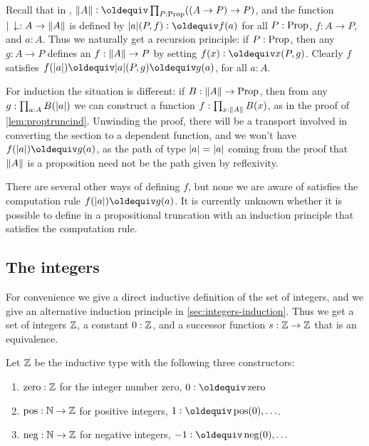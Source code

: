 \documentclass[a4paper,12pt]{amsart}
\begin{document}
Recall that in \UniMath{}, $\Trunc A \defeq \prod_{P:\Prop}((A \to P) \to P)$, and
the function $\trunc{\blank}: A\to\Trunc A$ is
defined by $\trunc a  (P,f) \defeq f(a)$ for all $P: \mathord{\mathrm{Prop}}$, $f: A\to P$, and $a:A$.
Thus we naturally get a recursion principle: if $P: \mathord{\mathrm{Prop}}$, then any
$g: A \to P$ defines an $f : \lVert A\rVert \to P$ by setting $f(x)\defeq x(P,g)$.
Clearly $f$ satisfies $f(\trunc a) \jdeq \trunc a (P,g) \jdeq g(a)$, for all $a:A$.

For induction the situation is different: if $B: \lVert A\rVert \to \mathord{\mathrm{Prop}}$,
then from any $g: \prod_{a:A} B(\lvert a\rvert)$ we can construct a function
$f: \prod_{x:\lVert A\rVert} B(x)$, as in the proof of \cref{lem:proptruncind}.
Unwinding the proof, there will be a transport involved in converting
the section to a dependent function, and we won't have $f(\trunc a) \jdeq g(a)$,
as the path of type $\lvert a\rvert = \lvert a\rvert$ coming from the proof that $\lVert A\rVert$ is
a proposition need not be the path given by reflexivity.

There are several other ways of defining $f$, but none we are aware of
satisfies the computation rule $f(\trunc a)\jdeq g(a)$.  It is currently
unknown whether it is possible to define in \UniMath{} a propositional
truncation with an induction principle that satisfies the computation rule.


\subsection{The integers}
\label{sec:integers}

For convenience we give a direct inductive
definition of the set of integers, and we give
an alternative induction principle in \cref{sec:integers-induction}.
Thus we get a set of integers $\mathbb{Z}$, a constant $0:\mathbb{Z}$,
and a successor function $s:\mathbb{Z}\to\mathbb{Z}$
that is an equivalence.

\begin{definition}\label{def:integers}
Let $\mathbb{Z}$ be the inductive type with the following three constructors:
\begin{enumerate}[topsep=0pt]
\item $\mathop{\mathrm{zero}}: \mathbb{Z}$ for the integer number zero,
$0 \defeq \zzero$
\item $\mathop{\mathrm{pos}}: \mathbb{N} \to \mathbb{Z}$ for positive {integers},
$1 \defeq \zpos(0),\ldots$.
\item $\mathop{\mathrm{neg}}: \mathbb{N} \to \mathbb{Z}$ for negative {integers},
$-1 \defeq \zneg(0),\ldots$
\end{enumerate}
\end{definition}
\end{document}
